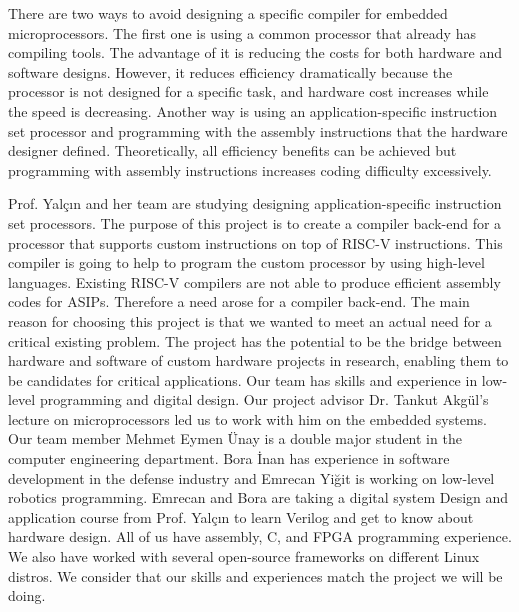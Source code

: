 There are two ways to avoid designing a specific compiler for embedded microprocessors. The first one is using a common processor that already has compiling tools. The advantage of it is reducing the costs for both hardware and software designs. However, it reduces efficiency dramatically because the processor is not designed for a specific task, and hardware cost increases while the speed is decreasing. Another way is using an application-specific instruction set processor and programming with the assembly instructions that the hardware designer defined. Theoretically, all efficiency benefits can be achieved but programming with assembly instructions increases coding difficulty excessively.

Prof. Yalçın and her team are studying designing application-specific instruction set processors. The purpose of this project is to create a compiler back-end for a processor that supports custom instructions on top of RISC-V instructions. This compiler is going to help to program the custom processor by using high-level languages. Existing RISC-V compilers are not able to produce efficient assembly codes for ASIPs. Therefore a need arose for a compiler back-end.
The main reason for choosing this project is that we wanted to meet an actual need for a critical existing problem. The project has the potential to be the bridge between hardware and software of custom hardware projects in research, enabling them to be candidates for critical applications. Our team has skills and experience in low-level programming and digital design. Our project advisor Dr. Tankut Akgül’s lecture on microprocessors led us to work with him on the embedded systems. Our team member Mehmet Eymen Ünay is a double major student in the computer engineering department. Bora İnan has experience in software development in the defense industry and Emrecan Yiğit is working on low-level robotics programming. Emrecan and Bora are taking a digital system Design and application course from Prof. Yalçın to learn Verilog and get to know about hardware design. All of us have assembly, C, and FPGA programming experience. We also have worked with several open-source frameworks on different Linux distros. We consider that our skills and experiences match the project we will be doing.

